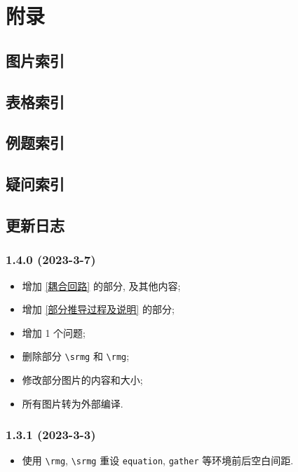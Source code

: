 \section{附录} \label{附录}
\subsection{图片索引} \label{图片索引}
\makeatletter
{}
\makeatother

\subsection{表格索引} \label{表格索引}
\makeatletter
{}
\makeatother

\subsection{例题索引} \label{例题索引}
\listofexampleprobs

\subsection{疑问索引} \label{疑问索引}
\listofquestions

\subsection{更新日志} \label{更新日志}
\subsubsection*{1.4.0 (2023-3-7)}
\begin{itemize}
    \item 增加 \ref{耦合回路} 的部分, 及其他内容;
    \item 增加 \ref{部分推导过程及说明} 的部分;
    \item 增加 1 个问题;
    \item 删除部分 \texttt{\textbackslash srmg} 和 \texttt{\textbackslash rmg};
    \item 修改部分图片的内容和大小;
    \item 所有图片转为外部编译.
\end{itemize}

\subsubsection*{1.3.1 (2023-3-3)}
\begin{itemize}
    \item 使用 \texttt{\textbackslash rmg}, \texttt{\textbackslash srmg} 重设 \texttt{equation}, \texttt{gather} 等环境前后空白间距.
\end{itemize}

